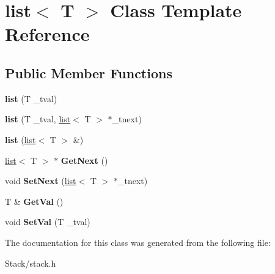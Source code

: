 \hypertarget{classlist}{}\section{list$<$ T $>$ Class Template Reference}
\label{classlist}
\subsection*{Public Member Functions}
\begin{DoxyCompactItemize}
\item 
\hypertarget{classlist_a5f317b0f566c0b9ca0f31e0b927fb7e4}{}{\bfseries list} (T \+\_\+tval)\label{classlist_a5f317b0f566c0b9ca0f31e0b927fb7e4}

\item 
\hypertarget{classlist_a244b5f8b92d576a9a84d3587185d10a9}{}{\bfseries list} (T \+\_\+tval, \hyperlink{classlist}{list}$<$ T $>$ $\ast$\+\_\+tnext)\label{classlist_a244b5f8b92d576a9a84d3587185d10a9}

\item 
\hypertarget{classlist_a2347224ab08486ac9966d598d6ed5743}{}{\bfseries list} (\hyperlink{classlist}{list}$<$ T $>$ \&)\label{classlist_a2347224ab08486ac9966d598d6ed5743}

\item 
\hypertarget{classlist_a6d25919f61226180125992343246c374}{}\hyperlink{classlist}{list}$<$ T $>$ $\ast$ {\bfseries Get\+Next} ()\label{classlist_a6d25919f61226180125992343246c374}

\item 
\hypertarget{classlist_a1e907f5f88c3f4861316c47a5821f31d}{}void {\bfseries Set\+Next} (\hyperlink{classlist}{list}$<$ T $>$ $\ast$\+\_\+tnext)\label{classlist_a1e907f5f88c3f4861316c47a5821f31d}

\item 
\hypertarget{classlist_a8ecb1aeedfd25cda4e506529323a8e8b}{}T \& {\bfseries Get\+Val} ()\label{classlist_a8ecb1aeedfd25cda4e506529323a8e8b}

\item 
\hypertarget{classlist_a83dfea25e06088dc9d0d7cab6317b057}{}void {\bfseries Set\+Val} (T \+\_\+tval)\label{classlist_a83dfea25e06088dc9d0d7cab6317b057}

\end{DoxyCompactItemize}


The documentation for this class was generated from the following file\+:\begin{DoxyCompactItemize}
\item 
Stack/stack.\+h\end{DoxyCompactItemize}
